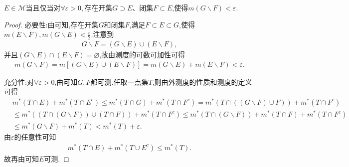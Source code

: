 \documentclass[../../main.tex]{subfiles}
\begin{document}
\begin{corollary}\label{corollary:集合可测的充要条件2}
$E\in \mathscr{M}$当且仅当对$\forall \varepsilon>0,$存在开集$G\supset E$、闭集$F\subset E$,使得$m(G\backslash F)<\varepsilon.$
\end{corollary}
\begin{proof}
{\heiti 必要性:}由可知,存在开集$G$和闭集$F$,满足$F\subset E\subset G$,使得$m(E\backslash F),m(G\backslash E)<\frac{\varepsilon}{2}$.注意到
\begin{align*}
G\backslash F=(G\backslash E)\cup (E\backslash F),
\end{align*}
并且$(G\backslash E)\cap (E\backslash F)=\varnothing$,故由测度的可数可加性可得
\begin{align*}
m(G\backslash F)=m[(G\backslash E)\cup (E\backslash F)]=m(G\backslash E)+m(E\backslash F)<\varepsilon.
\end{align*}

{\heiti 充分性:}对$\forall \varepsilon>0$,由可知$G,F$都可测.任取一点集$T$,则由外测度的性质和测度的定义可得
\begin{align*}
&m^*\left( T\cap E \right) +m^*\left( T\cap E^c \right) \leqslant m^*\left( T\cap G \right) +m^*\left( T\cap F^c \right) =m^*(T\cap \left( \left( G\backslash F \right) \cup F \right) )+m^*\left( T\cap F^c \right) 
\\
&\leqslant m^*\left( \left( T\cap \left( G\backslash F \right) \right) \cup \left( T\cap F \right) \right) +m^*\left( T\cap F^c \right) \leqslant m^*\left( T\cap \left( G\backslash F \right) \right) +m^*\left( T\cap F \right) +m^*\left( T\cap F^c \right) 
\\
&\leqslant m^*\left( G\backslash F \right) +m^*\left( T \right) <m^*\left( T \right) +\varepsilon .
\end{align*}
由$\varepsilon$的任意性可知
\begin{align*}
m^*\left( T\cap E \right) +m^*\left( T\cup E^c \right) \leqslant m^*(T).
\end{align*}
故再由可知$E$可测.
\end{proof}
\end{document}

